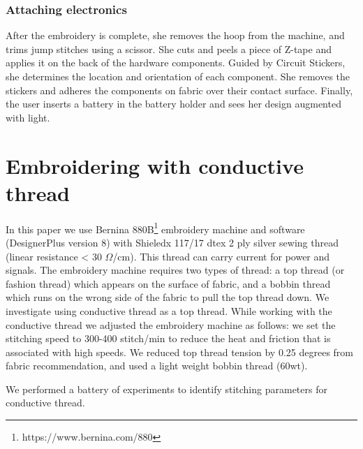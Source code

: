\documentclass[header.tex]{subfiles}
\begin{document}
\subsubsection{Attaching electronics}
After the embroidery is complete, she removes the hoop from the machine, and trims jump stitches using a scissor. She cuts and peels a piece of Z-tape and applies it on the back of the hardware components. Guided by Circuit Stickers, she determines the location and orientation of each component. She removes the stickers and adheres the components on fabric over their contact surface. Finally, the user inserts a battery in the battery holder and sees her design augmented with light.








\section{Embroidering with conductive thread}

In this paper we use Bernina 880B\footnote{https://www.bernina.com/880} embroidery machine and software (DesignerPlus version 8) with Shieledx 117/17 dtex 2 ply silver sewing thread (linear resistance < 30 $\Omega$/cm). 
This thread can carry current for power and signals. The embroidery machine requires two types of thread: a top thread (or fashion thread) which appears on the surface of fabric, and a bobbin thread which runs on the wrong side of the fabric to pull the top thread down. We investigate using conductive thread as a top thread. While working with the conductive thread we adjusted the embroidery machine as follows: we set the stitching speed to 300-400 stitch/min to reduce the heat and friction that is associated with high speeds. We reduced top thread tension by 0.25 degrees from fabric recommendation, and used a light weight bobbin thread (60wt).


We performed a battery of experiments to identify stitching parameters for conductive thread. 
\end{document}
